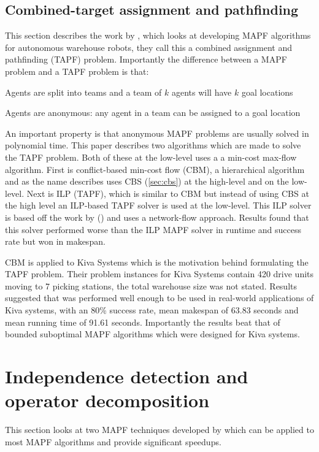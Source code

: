 \documentclass[a4paper,11pt]{article}
\begin{document}
\subsection{Combined-target assignment and pathfinding} \label{sec:tapf}
This section describes the work by \cite{ma2016optimal}, which looks at developing MAPF algorithms for autonomous warehouse robots, they call this a combined assignment and pathfinding (TAPF) problem. Importantly the difference between a MAPF problem and a TAPF problem is that:

\begin{compactitem}
	\item Agents are split into teams and a team of $k$ agents will have $k$ goal locations
	\item Agents are anonymous: any agent in a team can be assigned to a goal location
\end{compactitem}

An important property is that anonymous MAPF problems are usually solved in polynomial time. This paper describes two algorithms which are made to solve the TAPF problem. Both of these at the low-level uses a a min-cost max-flow algorithm. First is conflict-based min-cost flow (CBM), a hierarchical algorithm and as the name describes uses CBS (\ref{sec:cbs}) at the high-level and  on the low-level. Next is ILP (TAPF), which is similar to CBM but instead of using CBS at the high level an ILP-based TAPF solver is used at the low-level. This ILP solver is based off the work by (\cite{yu2013multi}) and uses a network-flow approach. Results found that this solver performed worse than the ILP MAPF solver in runtime and success rate but won in makespan.

CBM is applied to Kiva Systems which is the motivation behind formulating the TAPF problem. Their problem instances for Kiva Systems contain 420 drive units moving to 7 picking stations, the total warehouse size was not stated. Results suggested that  was performed well enough to be used in real-world applications of Kiva systems, with an 80\% success rate, mean makespan of 63.83 seconds and mean running time of 91.61 seconds. Importantly the results beat that of bounded suboptimal MAPF algorithms which were designed for Kiva systems.

\section{Independence detection and operator decomposition} \label{sec:generalimprovements}
This section looks at two MAPF techniques developed by \cite{standley2010finding} which can be applied to most MAPF algorithms and provide significant speedups.
\end{document}
